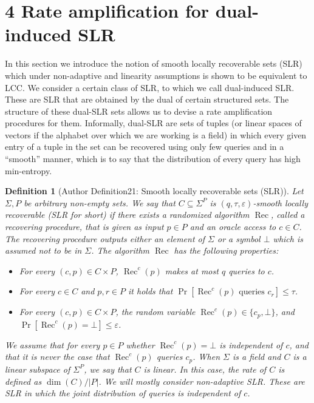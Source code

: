 \documentclass[10pt,a4paper]{article}
\newtheorem{ntdefinition}[nttheorem]{Definition}
\begin{document}
\section*{4 Rate amplification for dual-induced SLR}
In this section we introduce the notion of smooth locally recoverable sets (SLR) which under non-adaptive and linearity assumptions is shown to be equivalent to LCC. We consider a certain class of SLR, to which we call dual-induced SLR. These are SLR that are obtained by the dual of certain structured sets. The structure of these dual-SLR sets allows us to devise a rate amplification procedures for them. Informally, dual-SLR are sets of tuples (or linear spaces of vectors if the alphabet over which we are working is a field) in which every given entry of a tuple in the set can be recovered using only few queries and in a ``smooth'' manner, which is to say that the distribution of every query has high min-entropy.
\setcounter{nttheorem}{20}
\begin{ntdefinition}[Author Definition21: Smooth locally recoverable sets (SLR)]
Let $\Sigma,P$ be arbitrary non-empty sets. We say that $C\subseteq\Sigma^P$ is $(q,\tau,\varepsilon)$-smooth locally recoverable (SLR for short) if there exists a randomized algorithm $\operatorname{Rec}$, called a recovering procedure, that is given as input $p\in P$ and an oracle access to $c\in C$. The recovering procedure outputs either an element of $\Sigma$ or a symbol $\bot$ which is assumed not to be in $\Sigma$. The algorithm $\operatorname{Rec}$ has the following properties:
\begin{itemize}
\item For every $(c,p)\in C\times P$, $\operatorname{Rec}^c(p)$ makes at most $q$ queries to $c$.
\item For every $c\in C$ and $p,r\in P$ it holds that $\Pr[\operatorname{Rec}^c(p)\text{ queries }c_r]\leq\tau$.
\item For every $(c,p)\in C\times P$, the random variable $\operatorname{Rec}^c(p)\in\{c_p,\bot\}$, and $\Pr[\operatorname{Rec}^c(p)=\bot]\leq\varepsilon$.
\end{itemize}
We assume that for every $p\in P$ whether $\operatorname{Rec}^c(p)=\bot$ is independent of $c$, and that it is never the case that $\operatorname{Rec}^c(p)$ queries $c_p$. When $\Sigma$ is a field and $C$ is a linear subspace of $\Sigma^P$, we say that $C$ is linear. In this case, the rate of $C$ is defined as $\dim(C)/|P|$. We will mostly consider non-adaptive SLR. These are SLR in which the joint distribution of queries is independent of $c$.
\end{ntdefinition}
\end{document}
